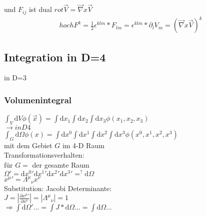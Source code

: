 \documentclass[a4paper]{article}
\begin{document}
und $F_{ij}$ ist dual $rot\vec{V}=\vec{\nabla} x \vec{V}$\\
\begin{align}
~hochF^k=\frac{1}{2}\epsilon^{klm}*F_{lm}=\epsilon^{klm}*\partial_l
V_m=(\vec{\nabla}x\vec{V})^k
\end{align}

\subsection{Integration in D=4}
in D=3 
\subsubsection{Volumenintegral} $\int_V \mathrm{d}V \phi(\vec{x})=\int \mathrm{d}x_1 \int \mathrm{d}x_2
  \int \mathrm{d}x_3 \phi(x_1,x_2,x_3)$ \\
  $\rightarrow in D4 $\\ $\int_G \mathrm{d}\Omega \phi(x)=\int \mathrm{d}x^0\int \mathrm{d}x^1 \int \mathrm{d}x^2
  \int \mathrm{d}x^3 \phi(x^0,x^1,x^2,x^3)$\\ mit dem Gebiet $G$ im 4-D Raum\\
  Transformationsverhalten: \\ für $G=$ der gesamte Raum
  \\$\Omega'=\mathrm{d}x^0{}'\mathrm{d}x^1{}'\mathrm{d}x^2{}'\mathrm{d}x^3{}'=^?\mathrm{d}\Omega$\\$x^\mu{}'=\Lambda^\mu{}_\nu
  x^\nu$\\ 
  Substitution: Jacobi Determinante:\\ $J=\left|\frac{\partial
  x^\mu{}'}{\partial x^\nu}\right|=\left|\Lambda^\mu{}_\nu\right|=1$ \\ 
  $\Rightarrow \int \mathrm{d}\Omega'\ldots=\int J*\mathrm{d}\Omega\ldots=\int \mathrm{d}\Omega\ldots$
\end{document}
